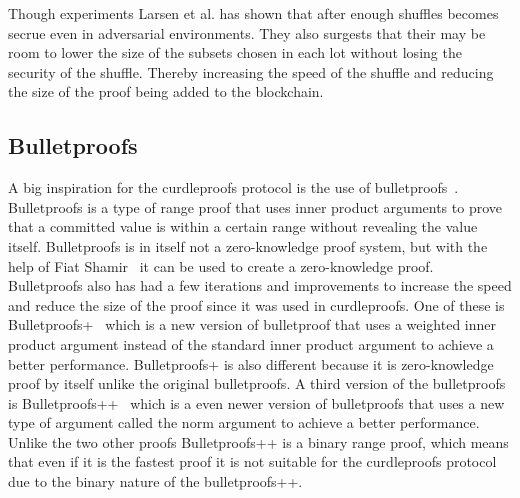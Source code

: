 Though experiments Larsen et al. has shown that after enough shuffles becomes secrue even in adversarial environments.
They also surgests that their may be room to lower the size of the subsets chosen in each lot without losing the security of the shuffle.
Thereby increasing the speed of the shuffle and reducing the size of the proof being added to the blockchain.

\subsection{Bulletproofs}\label{sec:related-work-bulletproofs}
A big inspiration for the curdleproofs protocol is the use of bulletproofs~\cite{bunz2018bulletproofs}.
Bulletproofs is a type of range proof that uses inner product arguments to prove that a committed value is within a certain range without revealing the value itself.
Bulletproofs is in itself not a zero-knowledge proof system, but with the help of Fiat Shamir~\cite{bunz2018bulletproofs} it can be used to create a zero-knowledge proof.
Bulletproofs also has had a few iterations and improvements to increase the speed and reduce the size of the proof since it was used in curdleproofs.
One of these is Bulletproofs+~\cite{chung2022bulletproofs+} which is a new version of bulletproof that uses a weighted inner product argument instead of the standard inner product argument to achieve a better performance.
Bulletproofs+ is also different because it is zero-knowledge proof by itself unlike the original bulletproofs.
A third version of the bulletproofs is Bulletproofs++~\cite{eagen2024bulletproofs++} which is a even newer version of bulletproofs that uses a new type of argument called the norm argument to achieve a better performance.
Unlike the two other proofs Bulletproofs++ is a binary range proof, which means that even if it is the fastest proof it is not suitable for the curdleproofs protocol due to the binary nature of the bulletproofs++.